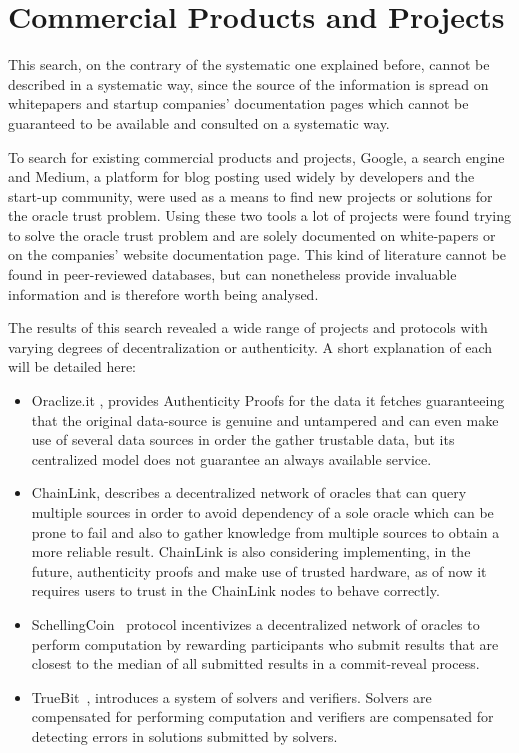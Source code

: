 \section{Commercial Products and Projects}

This search, on the contrary of the systematic one explained before, cannot be described in a systematic way, since the source of the information is spread on whitepapers and startup companies' documentation pages which cannot be guaranteed to be available and consulted on a systematic way.

To search for existing commercial products and projects, Google, a search engine and Medium, a platform for blog posting used widely by developers and the start-up community, were used as a means to find new projects or solutions for the oracle trust problem. Using these two tools a lot of projects were found trying to solve the oracle trust problem and are solely documented on white-papers or on the companies' website documentation page. This kind of literature cannot be found in peer-reviewed databases, but can nonetheless provide invaluable information and is therefore worth being analysed.

The results of this search revealed a wide range of projects and protocols with varying degrees of decentralization or authenticity. A short explanation of each will be detailed here:

\begin{itemize}
  \item Oraclize.it \citet{Oraclize}, provides Authenticity Proofs for the data it fetches guaranteeing that the original data-source is genuine and untampered and can even make use of several data sources in order the gather trustable data, but its centralized model does not guarantee an always available service.
  \item ChainLink\citet{Ellis2017}, describes a decentralized network of oracles that can query multiple sources in order to avoid dependency of a sole oracle which can be prone to fail and also to gather knowledge from multiple sources to obtain a more reliable result. ChainLink is also considering implementing, in the future, authenticity proofs and make use of trusted hardware, as of now it requires users to trust in the ChainLink nodes to behave correctly.
  \item SchellingCoin~\citet{VitalikButerin2014} protocol incentivizes a decentralized network of oracles to perform computation by rewarding participants who submit results that are closest to the median of all submitted results in a commit-reveal process.
  \item TrueBit~\citet{Teutsch2017}, introduces a system of solvers and verifiers. Solvers are compensated for performing computation and verifiers are compensated for detecting errors in solutions submitted by solvers.
\end{itemize}




